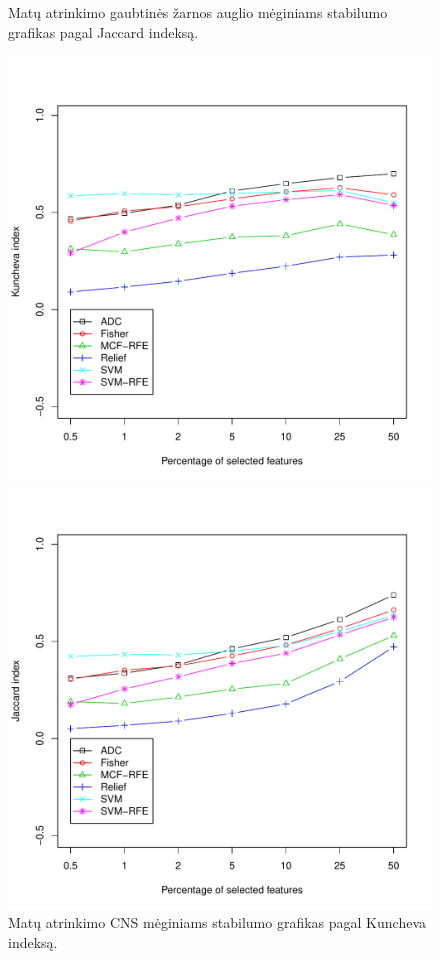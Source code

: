 \begin{figure}[H]
\begin{minipage}[b]{0.5\linewidth}
\caption{Matų atrinkimo gaubtinės žarnos auglio mėginiams stabilumo grafikas pagal Jaccard indeksą.}
\label{fig:robj_colon}
\end{minipage}
\hspace{0.2cm}
\begin{minipage}[b]{0.5\linewidth}
\centering
\includegraphics[width=.85\textwidth]{../bachelor/images/nncns_robustness_kuncheva.pdf}
\caption{Matų atrinkimo CNS mėginiams stabilumo grafikas pagal Kuncheva indeksą.}
\label{fig:robk_cns}
\end{minipage}
\hspace{0.2cm}
\begin{minipage}[b]{0.5\linewidth}
\centering
\includegraphics[width=.85\textwidth]{../bachelor/images/nncns_robustness_jaccard.pdf}

\end{minipage}
\end{figure}
